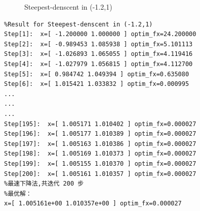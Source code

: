 \begin{figure}[H]
\caption{Steepest-denscent in (-1.2,1)}
\label{Fig.lable}
\end{figure}

\begin{lstlisting}
%Result for Steepest-denscent in (-1.2,1)
Step[1]:  x=[ -1.200000 1.000000 ] optim_fx=24.200000
Step[2]:  x=[ -0.989453 1.085938 ] optim_fx=5.101113
Step[3]:  x=[ -1.026893 1.065055 ] optim_fx=4.119416
Step[4]:  x=[ -1.027979 1.056815 ] optim_fx=4.112700
Step[5]:  x=[ 0.984742 1.049394 ] optim_fx=0.635080
Step[6]:  x=[ 1.015421 1.033832 ] optim_fx=0.000995
...
...
...
Step[195]:  x=[ 1.005171 1.010402 ] optim_fx=0.000027
Step[196]:  x=[ 1.005177 1.010389 ] optim_fx=0.000027
Step[197]:  x=[ 1.005163 1.010386 ] optim_fx=0.000027
Step[198]:  x=[ 1.005169 1.010373 ] optim_fx=0.000027
Step[199]:  x=[ 1.005155 1.010370 ] optim_fx=0.000027
Step[200]:  x=[ 1.005161 1.010357 ] optim_fx=0.000027
%最速下降法,共迭代 200 步
%最优解：
x=[ 1.005161e+00 1.010357e+00 ] optim_fx=0.000027
\end{lstlisting}

